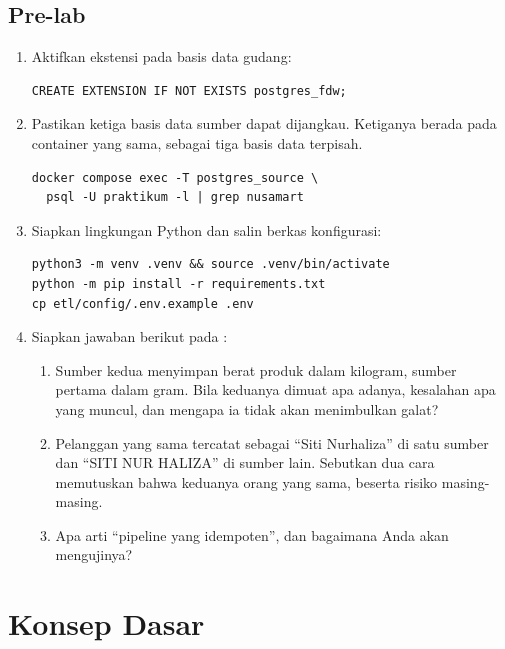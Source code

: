 \subsection{Pre-lab}

\begin{enumerate}[leftmargin=1.4em]
  \item Aktifkan ekstensi pada basis data gudang:
\begin{lstlisting}[style=sqlgaya]
CREATE EXTENSION IF NOT EXISTS postgres_fdw;
\end{lstlisting}
  \item Pastikan ketiga basis data sumber dapat dijangkau. Ketiganya berada
        pada container  yang sama, sebagai tiga
        basis data terpisah.
\begin{lstlisting}[style=shellgaya]
docker compose exec -T postgres_source \
  psql -U praktikum -l | grep nusamart
\end{lstlisting}
  \item Siapkan lingkungan Python dan salin berkas konfigurasi:
\begin{lstlisting}[style=shellgaya]
python3 -m venv .venv && source .venv/bin/activate
python -m pip install -r requirements.txt
cp etl/config/.env.example .env
\end{lstlisting}
  \item Siapkan jawaban berikut pada :
  \begin{enumerate}[label=\alph*.,leftmargin=1.4em]
    \item Sumber kedua menyimpan berat produk dalam kilogram, sumber pertama
          dalam gram. Bila keduanya dimuat apa adanya, kesalahan apa yang
          muncul, dan mengapa ia tidak akan menimbulkan galat?
    \item Pelanggan yang sama tercatat sebagai ``Siti Nurhaliza'' di satu
          sumber dan ``SITI NUR HALIZA'' di sumber lain. Sebutkan dua cara
          memutuskan bahwa keduanya orang yang sama, beserta risiko
          masing-masing.
    \item Apa arti ``pipeline yang idempoten'', dan bagaimana Anda akan
          mengujinya?
  \end{enumerate}
\end{enumerate}

\section{Konsep Dasar}

